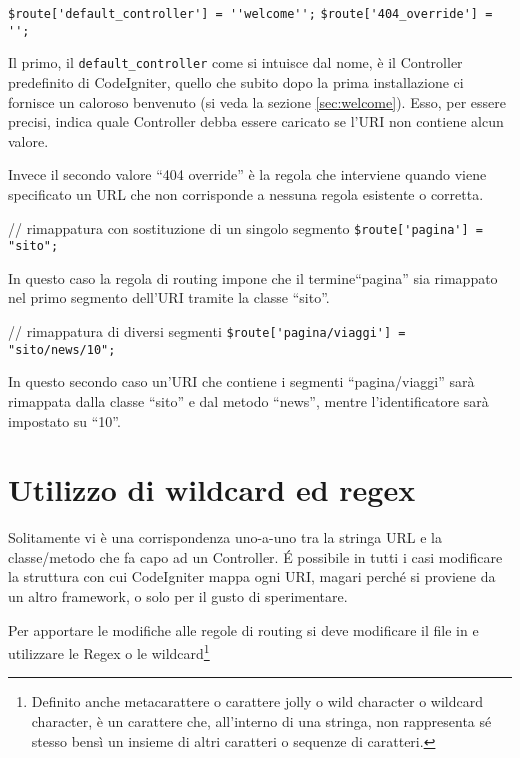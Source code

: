 \begin{code}
\verb|$route['default_controller'] = ''welcome'';|
\verb|$route['404_override'] = '';|
\end{code}

Il primo, il \verb|default_controller| come si intuisce dal nome, è il Controller predefinito di CodeIgniter, quello che subito dopo la prima installazione ci fornisce un caloroso benvenuto (si veda la sezione \vref{sec:welcome}). Esso, per essere precisi, indica quale Controller debba essere caricato se l'URI non contiene alcun valore.

Invece il secondo valore ``404 override'' è la regola che interviene quando viene specificato un \ac{URL} che non corrisponde a nessuna regola esistente o corretta.

\begin{code}
// rimappatura con sostituzione di un singolo segmento
\verb|$route['pagina'] = "sito";|
\end{code}

In questo caso la regola di routing impone che il termine``pagina'' sia rimappato nel primo segmento dell'URI tramite la classe ``sito''. 

\begin{code}
// rimappatura di diversi segmenti
\verb|$route['pagina/viaggi'] = "sito/news/10";|
\end{code}

In questo secondo caso un'URI che contiene i segmenti ``pagina/viaggi'' sarà rimappata dalla classe ``sito'' e dal metodo ``news'', mentre l'identificatore sarà impostato su ``10''.

\section{Utilizzo di wildcard ed regex}
Solitamente vi è una corrispondenza uno-a-uno tra la stringa \ac{URL} e la classe/metodo che fa capo ad un Controller. \'E possibile in tutti i casi modificare la struttura con cui CodeIgniter mappa ogni \ac{URI}, magari perché si proviene da un altro framework, o solo per il gusto di sperimentare. 

Per apportare le modifiche alle regole di routing si deve modificare il file  in  e utilizzare le Regex o le wildcard\footnote{Definito anche metacarattere o carattere jolly o wild character o wildcard character, è un carattere che, all'interno di una stringa, non rappresenta sé stesso bensì un insieme di altri caratteri o sequenze di caratteri.}

